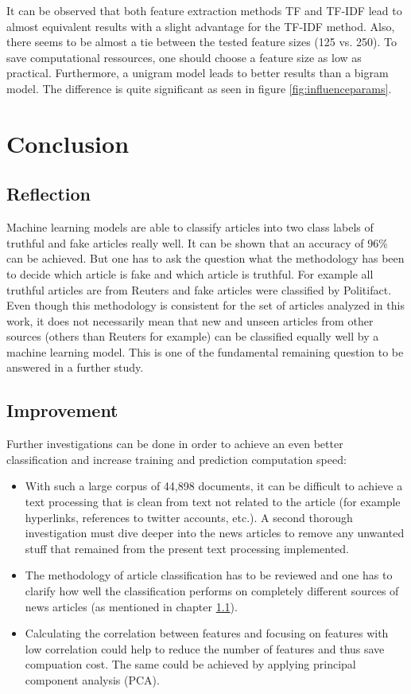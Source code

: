 \documentclass[a4paper,12pt,nottoc]{article}
\begin{document}
\noindent It can be observed that both feature extraction methods TF and TF-IDF lead to almost equivalent results with a slight advantage for the TF-IDF method. Also, there seems to be almost a tie between the tested feature sizes (125 vs. 250). To save computational ressources, one should choose a feature size as low as practical. Furthermore, a unigram model leads to better results than a bigram model. The difference is quite significant as seen in figure \ref{fig:influenceparams}. 

\clearpage
\section{Conclusion} 

\subsection{Reflection}\label{chap:reflection}

Machine learning models are able to classify articles into two class labels of truthful and fake articles really well. It can be shown that an accuracy of 96\% can be achieved. But one has to ask the question what the methodology has been to decide which article is fake and which article is truthful. For example all truthful articles are from Reuters and fake articles were classified by Politifact. Even though this methodology is consistent for the set of articles analyzed in this work, it does not necessarily mean that new and unseen articles from other sources (others than Reuters for example) can be classified equally well by a machine learning model. This is one of the fundamental remaining question to be answered in a further study.

\subsection{Improvement}

Further investigations can be done in order to achieve an even better classification and increase training and prediction computation speed:

\begin{itemize}
\item{With such a large corpus of 44,898 documents, it can be difficult to achieve a text processing that is clean from text not related to the article (for example hyperlinks, references to twitter accounts, etc.). A second thorough investigation must dive deeper into the news articles to remove any unwanted stuff that remained from the present text processing implemented.}
\item{The methodology of article classification has to be reviewed and one has to clarify how well the classification performs on completely different sources of news articles (as mentioned in chapter \ref{chap:reflection}).}
\item{Calculating the correlation between features and focusing on features with low correlation could help to reduce the number of features and thus save compuation cost. The same could be achieved by applying principal component analysis (PCA).}
\end{itemize}
\end{document}
